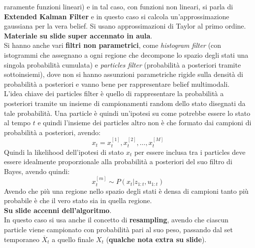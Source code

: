 \documentclass[a4paper,12pt, oneside]{book}
\begin{document}
raramente funzioni lineari) e in tal caso, con funzioni non 
lineari, si parla di \textbf{Extended Kalman Filter} e in questo caso si calcola
un'approssimazione gaussiana per la vera belief. Si usano approssimazioni di
Taylor al primo ordine. \textbf{Materiale su slide super accennato in aula}.\\
Si hanno anche vari \textbf{filtri non parametrici}, come \textit{histogram
  filter} (con istogrammi che assegnano a ogni regione che decompone lo spazio
degli stati una singola probabilità cumulata) e \textit{particles filter}
(probabilità a posteriori tramite 
sottoinsiemi), dove non si hanno assunzioni parametriche 
rigide sulla densità di probabilità a posteriori e vanno bene per rappresentare
belief multimodali.\\
L'idea chiave dei particles filter è quello di rappresentare la probabilità a
posteriori tramite un insieme di campionamenti random dello stato disegnati da
tale probabilità. Una particle è quindi un'ipotesi su come potrebbe essere lo
stato al tempo $t$ e quindi l'insieme dei particles altro non è che formato dai
campioni di probabilità a posteriori, avendo:
\[x_t=x_t^{[1]}, x_t^{[2]},\ldots,x_t^{[M]}\]
Quindi la likelihood dell'ipotesi di stato $x_t$ per essere inclusa tra i
particles deve essere idealmente proporzionale alla probabilità a posteriori del
suo filtro di Bayes, avendo quindi:
\[x_t^{[m]}\sim P(x_t|z_{1:t},u_{1:t})\]
Avendo che più una regione nello spazio degli stati è densa di campioni tanto
più probabile è che il vero stato sia in quella regione. \\
\textbf{Su slide accenni dell'algoritmo}.\\
In questo caso si usa anche il concetto di \textbf{resampling}, avendo che
ciascun particle viene campionato con probabilità pari al suo peso, passando dal
set temporaneo $\overline{X}_t$ a quello finale $X_t$ (\textbf{qualche nota
  extra su slide}).
\end{document}
